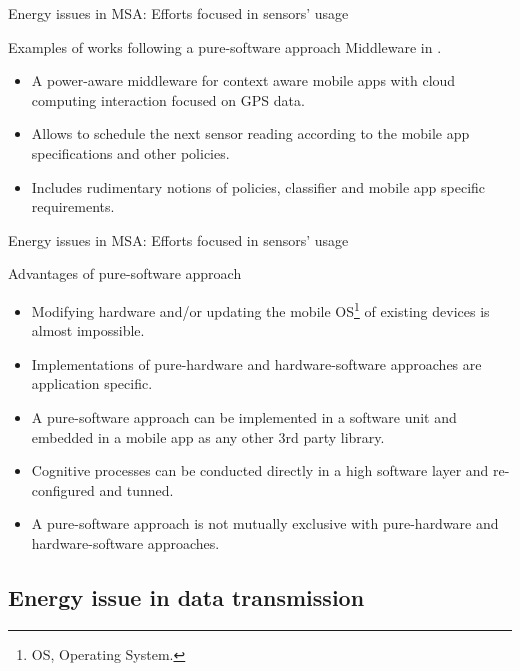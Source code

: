\begin{frame}{Energy issues in MSA: Efforts focused in sensors' usage}
  \begin{block}{Examples of works following a pure-software approach}
    Middleware in \citep{Perez-Torres2012}.
    \begin{itemize}
      \item A power-aware middleware for context aware mobile apps with cloud computing interaction focused on GPS data.
      \item Allows to schedule the next sensor reading according to the mobile app specifications and other policies.
      \item Includes rudimentary notions of policies, classifier and mobile app specific requirements.
    \end{itemize}
  \end{block}
\end{frame}

\begin{frame}{Energy issues in MSA: Efforts focused in sensors' usage}
  \begin{block}{Advantages of pure-software approach}
    \begin{itemize}   
      \item
        Modifying hardware and/or updating the mobile OS\footnote{OS, Operating System.} of existing devices is almost impossible.
      \item
        Implementations of pure-hardware and hardware-software approaches are application specific.
      \item
        A pure-software approach can be implemented in a software unit and embedded in a mobile app as any other 3rd party library.
      \item
        Cognitive processes can be conducted directly in a high software layer and re-configured and tunned.
      \item 
        A pure-software approach is not mutually exclusive with pure-hardware and hardware-software approaches.
    \end{itemize}
  \end{block}
\end{frame}

\subsection{Energy issue in data transmission}

